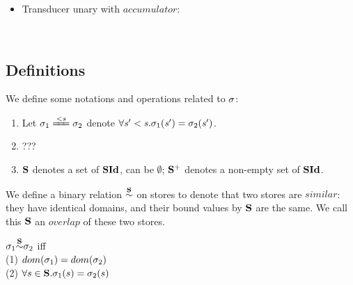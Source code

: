 \begin{itemize}
\begin{mdframed}
\begin{itemize}

\item Transducer unary with $accumulator$: \\


 \\


\end{itemize}
\end{mdframed}


\end{itemize}





\subsection{Definitions}

We define some notations and operations related to $\sgm$:
\begin{enumerate}[(1)]
	\item Let $\sgm_1 \ConEq{\s} \sgm_2$ denote $\forall \s' < \s. \sgm_1(\s') = \sgm_2(\s')$. 

	\item ??? 
	
	\item $\S$ denotes a set of $\SId$, can be $\emptyset$; $\S^+$ denotes a non-empty set of $\SId$.
	 	
	
\end{enumerate}


We define a binary relation $\~\S$ on stores to denote that two stores are $similar$: they have identical domains, and their bound values by $\S$ are the same. 
We call this $\S$ an $overlap$ of these two stores.

\begin{defi}
	\label{def-sgm-sim}
	
	$\sgm_1 {\~{\S}} \sgm_2 $
	iff \\
	(1) $dom(\sgm_1) = dom(\sgm_2)$ \\
	(2) $\forall s \in \S.\sgm_1(s)= \sgm_2(s)$ \\
\end{defi}

